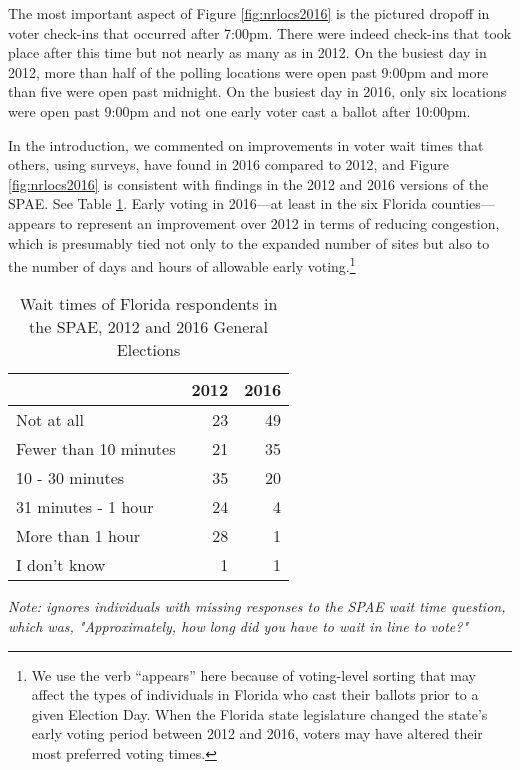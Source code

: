 \documentclass[12pt,titlepage]{article}
\begin{document}
The most important aspect of Figure \ref{fig:nrlocs2016} is the
pictured dropoff in voter check-ins that occurred after 7:00pm.  There
were indeed check-ins that took place after this time but not nearly
as many as in 2012.  On the busiest day in 2012, more than half of the
polling locations were open past 9:00pm and more than five were open
past midnight.  On the busiest day in 2016, only six locations were
open past 9:00pm and not one early voter cast a ballot after 10:00pm.

In the introduction, we commented on improvements in voter wait times
that others, using surveys, have found in 2016 compared to 2012, and
Figure \ref{fig:nrlocs2016} is consistent with findings in the 2012
\citep{spae2012} and 2016 \citep{spae2016} versions of the SPAE.  See
Table \ref{tab:floridaspae}.  Early voting in 2016---at least in the
six Florida counties---appears to represent an improvement over 2012
in terms of reducing congestion, which is presumably tied not only to
the expanded number of sites but also to the number of days and hours
of allowable early voting.\footnote{We use the verb ``appears'' here
  because of voting-level sorting that may affect the types of
  individuals in Florida who cast their ballots prior to a given
  Election Day.  When the Florida state legislature changed the
  state's early voting period between 2012 and 2016, voters may have
  altered their most preferred voting times.}

\begin{table}[ht]
\centering
\caption{Wait times of Florida respondents in the SPAE, 2012 and 2016 General Elections} 
\label{tab:floridaspae}
\begin{tabular}{lrr}
  \hline
 & 2012 & 2016 \\ 
  \hline
  Not at all &  23 &  49 \\ 
  Fewer than 10 minutes &  21 &  35 \\ 
  10 - 30 minutes &  35 &  20 \\ 
  31 minutes - 1 hour &  24 &   4 \\ 
  More than 1 hour &  28 &   1 \\ 
  I don't know &   1 &   1 \\ 
   \hline
\end{tabular}
\begin{flushleft}
  \emph{Note: ignores individuals with missing responses to the SPAE
    wait time question, which was, "Approximately, how long did you have to wait in line to vote?"}
\end{flushleft}
\end{table}
\end{document}
